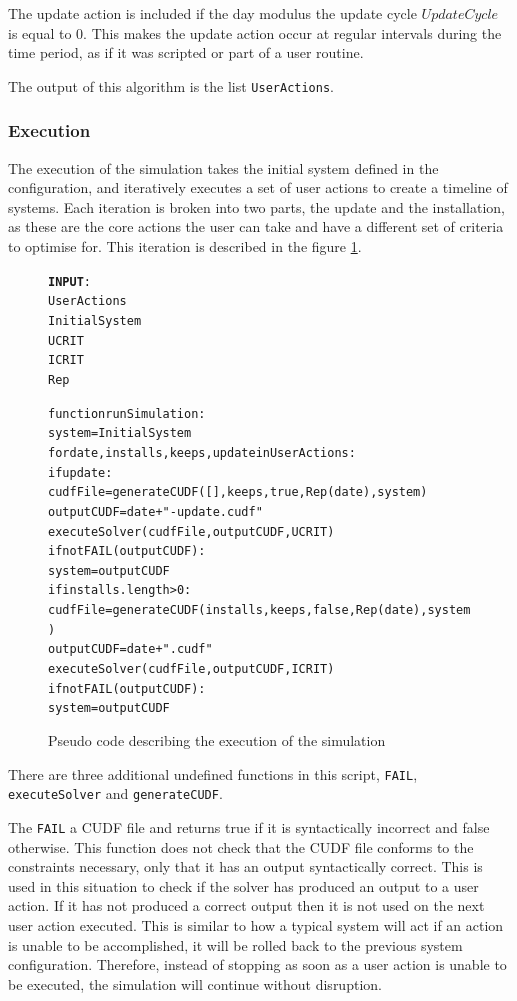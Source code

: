 The update action is included if the day modulus the update cycle $UpdateCycle$ is equal to 0.
This makes the update action occur at regular intervals during the time period, as if it was scripted or part of a user routine.

The output of this algorithm is the list \verb+UserActions+.

\subsubsection{Execution}
The execution of the simulation takes the initial system defined in the configuration, and iteratively executes a set of user actions to create a timeline of systems.
Each iteration is broken into two parts, the update and the installation, as these are the core actions the user can take and have a different set of criteria to optimise for.
This iteration is described in the figure \ref{executeSimulation}.

\begin{figure}[htp]
\begin{center}
\begin{alltt}
\textbf{INPUT}:
UserActions
InitialSystem
UCRIT
ICRIT
Rep

function runSimulation:
    system = InitialSystem
    for date,installs,keeps,update in UserActions:
        if update:
            cudfFile = generateCUDF([],keeps,true,Rep(date),system)        
            outputCUDF  = date + "-update.cudf"
            executeSolver(cudfFile, outputCUDF, UCRIT)
            if not FAIL(outputCUDF):
                system = outputCUDF
        if installs.length > 0:
            cudfFile = generateCUDF(installs,keeps,false,Rep(date),system)        
            outputCUDF  = date + ".cudf"
            executeSolver(cudfFile, outputCUDF, ICRIT)
            if not FAIL(outputCUDF):
                system = outputCUDF
            
\end{alltt}
\caption[Execute Simulation]{Pseudo code describing the execution of the simulation}
\label{executeSimulation}
\end{center}
\end{figure}

There are three additional undefined functions in this script, \verb+FAIL+, \verb+executeSolver+ and \verb+generateCUDF+.

The \verb+FAIL+ a CUDF file and returns true if it is syntactically incorrect and false otherwise.
This function does not check that the CUDF file conforms to the constraints necessary, only that it has an output syntactically correct.
This is used in this situation to check if the solver has produced an output to a user action.
If it has not produced a correct output then it is not used on the next user action executed. 
This is similar to how a typical system will act if an action is unable to be accomplished, it will be rolled back to the previous system configuration.
Therefore, instead of stopping as soon as a user action is unable to be executed, the simulation will continue without disruption.

